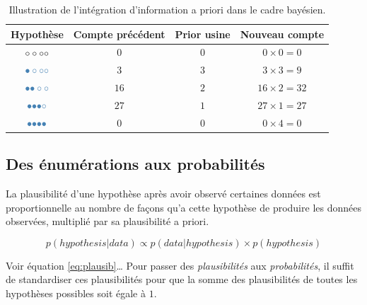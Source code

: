 \documentclass[
  a4paper,11pt,twoside,onecolumn,openright,final,oldfontcommands]{memoir}
\theoremstyle{definition}
\theoremstyle{definition}
\theoremstyle{definition}
\theoremstyle{remark}
\begin{document}
\begin{table}[!htb]

\begin{center}
\begin{threeparttable}

\caption{\label{tab:prior-table}Illustration de l'intégration d'information a priori dans le cadre bayésien.}

\begin{tabular}{cccc}
\toprule
Hypothèse & Compte précédent & Prior usine & Nouveau compte\\
\midrule
$\LARGE \circ \circ \circ \circ$ & $0$ & $0$ & $0 \times 0 = 0$\\
$\LARGE \color{steelblue}{\bullet} \circ \circ \circ$ & $3$ & $3$ & $3 \times 3 = 9$\\
$\LARGE \color{steelblue}{\bullet} \color{steelblue}{\bullet} \circ \circ$ & $16$ & $2$ & $16 \times 2 = 32$\\
$\LARGE \color{steelblue}{\bullet} \color{steelblue}{\bullet} \color{steelblue}{\bullet} \circ$ & $27$ & $1$ & $27 \times 1 = 27$\\
$\LARGE \color{steelblue}{\bullet} \color{steelblue}{\bullet} \color{steelblue}{\bullet} \color{steelblue}{\bullet}$ & $0$ & $0$ & $0 \times 4 = 0$\\
\bottomrule
\end{tabular}

\end{threeparttable}
\end{center}

\end{table}

\hypertarget{des-uxe9numuxe9rations-aux-probabilituxe9s}{%
\subsection{Des énumérations aux probabilités}\label{des-uxe9numuxe9rations-aux-probabilituxe9s}}

La plausibilité d'une hypothèse après avoir observé certaines données est proportionnelle au nombre de façons qu'a cette hypothèse de produire les données observées, multiplié par sa plausibilité a priori.

\begin{equation}
p(hypothesis|data)\propto p(data|hypothesis) \times p(hypothesis)
\label{eq:plausib}
\end{equation}

Voir équation \eqref{eq:plausib}\ldots{} Pour passer des \emph{plausibilités} aux \emph{probabilités}, il suffit de standardiser ces plausibilités pour que la somme des plausibilités de toutes les hypothèses possibles soit égale à \(1\).
\end{document}
